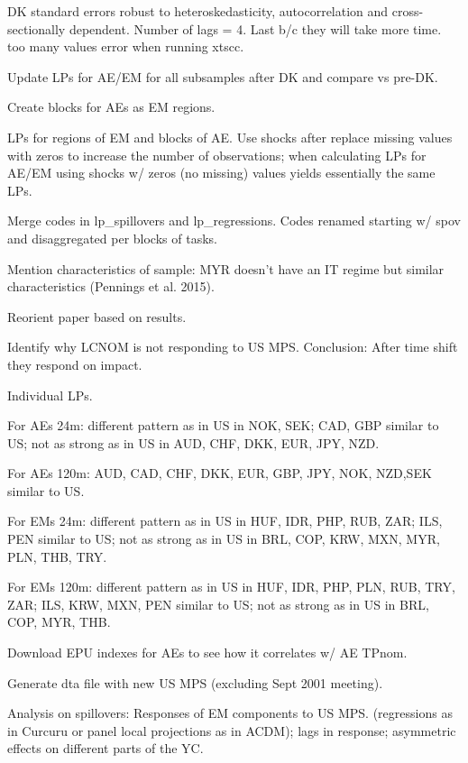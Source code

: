 \documentclass[12pt]{article}
\newcommand{\cmark}{\ding{51}}
\newcommand{\xmark}{\ding{55}}
\newcommand{\done}{\rlap{$\square$}{\raisebox{2pt}{\large\hspace{1pt}\cmark}}%
	\hspace{-2.5pt}}
\newcommand{\wontdo}{\rlap{$\square$}{\large\hspace{1pt}\xmark}}
\begin{document}
\begin{todolist}
\begin{todolist}
		\item[\wontdo] DK standard errors robust to heteroskedasticity, autocorrelation and cross-sectionally dependent. Number of lags = 4. Last b/c they will take more time. too many values error when running xtscc.
		\item[\wontdo] Update LPs for AE/EM for all subsamples after DK and compare vs pre-DK.
		\item[\done] Create blocks for AEs as EM regions.
		\item[\done] LPs for regions of EM and blocks of AE. Use shocks after replace missing values with zeros to increase the number of observations; when calculating LPs for AE/EM using shocks w/ zeros (no missing) values yields essentially the same LPs.
		\item[\done] Merge codes in lp_spillovers and lp_regressions. Codes renamed starting w/ spov and disaggregated per blocks of tasks.
	\end{todolist}
	\item[\done] Mention characteristics of sample: MYR doesn't have an IT regime but similar characteristics (Pennings et al. 2015).
	\item[\done] Reorient paper based on results.
	\item[\done] Identify why LCNOM is not responding to US MPS. Conclusion: After time shift they respond on impact.
	\item[\done] Individual LPs.
	\begin{todolist}
		\item For AEs 24m: different pattern as in US in NOK, SEK; CAD, GBP similar to US; not as strong as in US in AUD, CHF, DKK, EUR, JPY, NZD.
		\item For AEs 120m: AUD, CAD, CHF, DKK, EUR, GBP, JPY, NOK, NZD,SEK similar to US.
		\item For EMs 24m: different pattern as in US in HUF, IDR, PHP, RUB, ZAR; ILS, PEN similar to US; not as strong as in US in BRL, COP, KRW, MXN, MYR, PLN, THB, TRY.
		\item For EMs 120m: different pattern as in US in HUF, IDR, PHP, PLN, RUB, TRY, ZAR; ILS, KRW, MXN, PEN similar to US; not as strong as in US in BRL, COP, MYR, THB.
	\end{todolist}
	\item[\done] Download EPU indexes for AEs to see how it correlates w/ AE TPnom.
	\item[\done] Generate dta file with new US MPS (excluding Sept 2001 meeting).
	\item[\done] Analysis on spillovers: Responses of EM components to US MPS. (regressions as in Curcuru or panel local projections as in ACDM); lags in response; asymmetric effects on different parts of the YC.

\end{todolist}
\end{document}
